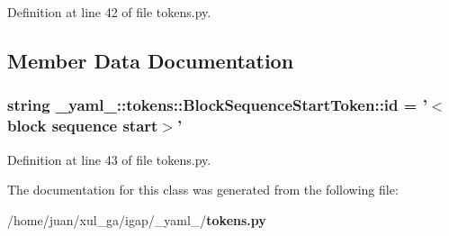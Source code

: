 Definition at line 42 of file tokens.py.

\subsection{Member Data Documentation}
\subsubsection{\setlength{\rightskip}{0pt plus 5cm}string {\bf \_\-yaml\_\-::tokens::BlockSequenceStartToken::id} = '$<$block sequence start$>$'\hspace{0.3cm}{\tt  [static]}}\label{class__yaml___1_1tokens_1_1BlockSequenceStartToken_5fb9d418db5e19572e9dc82f43b9f775}




Definition at line 43 of file tokens.py.

The documentation for this class was generated from the following file:\begin{CompactItemize}
\item 
/home/juan/xul\_\-ga/igap/\_\-yaml\_\-/{\bf tokens.py}\end{CompactItemize}
